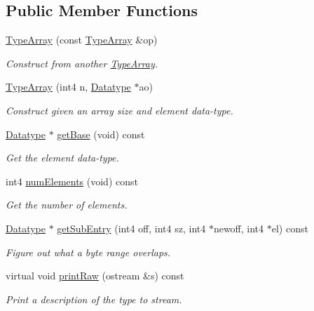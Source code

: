 \subsection*{Public Member Functions}
\begin{DoxyCompactItemize}
\item 
\mbox{\hyperlink{class_type_array_a1991aed5df70227756aa4a7fa3d44734}{Type\+Array}} (const \mbox{\hyperlink{class_type_array}{Type\+Array}} \&op)
\begin{DoxyCompactList}\small\item\em Construct from another \mbox{\hyperlink{class_type_array}{Type\+Array}}. \end{DoxyCompactList}\item 
\mbox{\hyperlink{class_type_array_ad3046208a1f97b8937cac81bddb8c0cc}{Type\+Array}} (int4 n, \mbox{\hyperlink{class_datatype}{Datatype}} $\ast$ao)
\begin{DoxyCompactList}\small\item\em Construct given an array size and element data-\/type. \end{DoxyCompactList}\item 
\mbox{\hyperlink{class_datatype}{Datatype}} $\ast$ \mbox{\hyperlink{class_type_array_ab6e6a5e04271b6af1f5c85fee3d94f7e}{get\+Base}} (void) const
\begin{DoxyCompactList}\small\item\em Get the element data-\/type. \end{DoxyCompactList}\item 
int4 \mbox{\hyperlink{class_type_array_af8a598d1ee0bc8966c5ceaa72d08027d}{num\+Elements}} (void) const
\begin{DoxyCompactList}\small\item\em Get the number of elements. \end{DoxyCompactList}\item 
\mbox{\hyperlink{class_datatype}{Datatype}} $\ast$ \mbox{\hyperlink{class_type_array_a28e877f54b005b28e44bcc136f307a0b}{get\+Sub\+Entry}} (int4 off, int4 sz, int4 $\ast$newoff, int4 $\ast$el) const
\begin{DoxyCompactList}\small\item\em Figure out what a byte range overlaps. \end{DoxyCompactList}\item 
virtual void \mbox{\hyperlink{class_type_array_a16a9d1e80de3beda0a101b7942dc1f77}{print\+Raw}} (ostream \&s) const
\begin{DoxyCompactList}\small\item\em Print a description of the type to stream. \end{DoxyCompactList}\item 

\end{DoxyCompactItemize}
